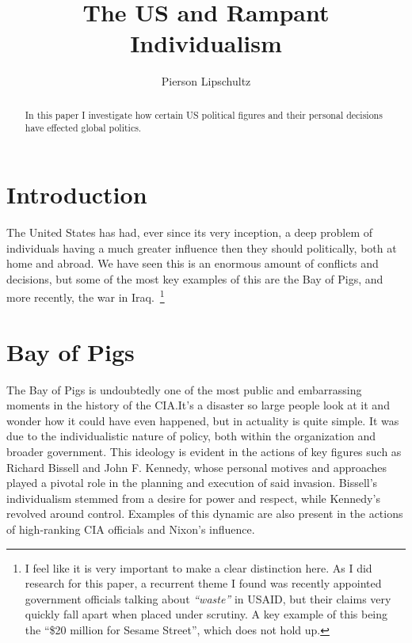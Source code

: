 \documentclass{article}
\title{The US and Rampant Individualism }
\author{Pierson Lipschultz}
\begin{document}
\maketitle

\begin{abstract}
    In this paper I investigate how certain US political figures and their personal decisions have effected global politics.  
\end{abstract}


\section{Introduction}
    The United States has had, ever since its very inception, a deep problem of individuals having a much greater influence then they should politically, both at home and abroad. We have seen this is an enormous amount of conflicts and decisions, but some of the most key examples of this are the Bay of Pigs, and more recently, the war in Iraq.~\footnote{I feel like it is very important to make a clear distinction here. As I did research for this paper, a recurrent  theme I found was recently appointed government officials talking about \textit{``waste''} in USAID, but their claims very quickly fall apart when placed under scrutiny. A key example of this being the ``\$20 million for Sesame Street'', which does not hold up.}

\section{Bay of Pigs}

    The Bay of Pigs is undoubtedly one of the most public and embarrassing moments in the history of the CIA.\@ It's a disaster so large people look at it and wonder how it could have even happened, but in actuality is quite simple. It was due to the individualistic nature of policy, both within the organization and broader government. This ideology is evident in the actions of key figures such as Richard Bissell and John F. Kennedy, whose personal motives and approaches played a pivotal role in the planning and execution of said invasion. Bissell's individualism stemmed from a desire for power and respect, while Kennedy's revolved around control. Examples of this dynamic are also present in the actions of high-ranking CIA officials and Nixon's influence.~\cite{JeffreysJones2003}
\end{document}
